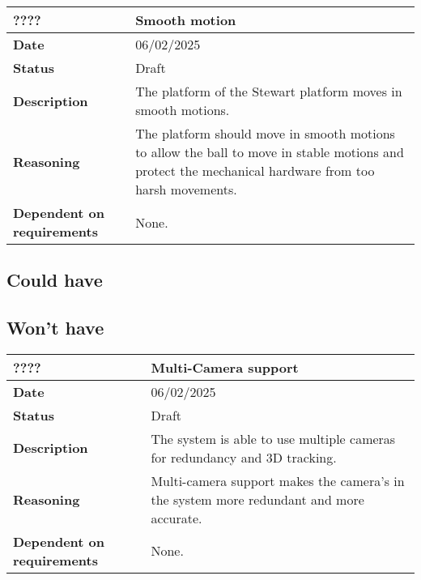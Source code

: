 \documentclass{article}
\begin{document}
\begin{table}[H]
    \renewcommand{\arraystretch}{1.3}
    \begin{tabular}{|l|p{10cm}|}
        \hline
        \rowcolor{gray!50}
        \textbf{????} & \textbf{Smooth motion} \\ \hline
        \textbf{Date} & 06/02/2025 \\ \hline
        \textbf{Status} & Draft \\ \hline
        \textbf{Description} & The platform of the Stewart platform moves in smooth motions. \\ \hline
        \textbf{Reasoning} & The platform should move in smooth motions to allow the ball to move in stable motions and protect the mechanical hardware from too harsh movements. \\ \hline
        \textbf{Dependent on requirements} & None. \\ \hline
    \end{tabular}
\end{table}

\subsection{Could have}

\subsection{Won't have}
\begin{table}[H]
    \renewcommand{\arraystretch}{1.3}
    \begin{tabular}{|l|p{10cm}|}
        \hline
        \rowcolor{gray!50}
        \textbf{????} & \textbf{Multi-Camera support} \\ \hline
        \textbf{Date} & 06/02/2025 \\ \hline
        \textbf{Status} & Draft \\ \hline
        \textbf{Description} & The system is able to use multiple cameras for redundancy and 3D tracking. \\ \hline
        \textbf{Reasoning} & Multi-camera support makes the camera's in the system more redundant and more accurate. \\ \hline
        \textbf{Dependent on requirements} & None. \\ \hline
    \end{tabular}
\end{table}
\end{document}
